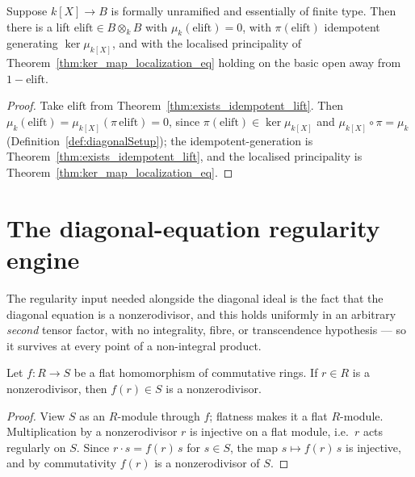 \begin{theorem}
  \label{thm:exists_diagonalLocalization}
  \leanok
  Suppose \(k[X] \to B\) is formally unramified and essentially of finite type. Then there is a
  lift \(\mathrm{elift} \in B \otimes_k B\) with \(\mu_k(\mathrm{elift}) = 0\), with
  \(\pi(\mathrm{elift})\) idempotent generating \(\ker \mu_{k[X]}\), and with the localised
  principality of Theorem~\ref{thm:ker_map_localization_eq} holding on the basic open away from
  \(1 - \mathrm{elift}\).
\end{theorem}
\begin{proof}
  \leanok
  Take \(\mathrm{elift}\) from Theorem~\ref{thm:exists_idempotent_lift}. Then
  \(\mu_k(\mathrm{elift}) = \mu_{k[X]}(\pi\,\mathrm{elift}) = 0\), since \(\pi(\mathrm{elift}) \in
  \ker \mu_{k[X]}\) and \(\mu_{k[X]} \circ \pi = \mu_k\) (Definition~\ref{def:diagonalSetup}); the
  idempotent-generation is Theorem~\ref{thm:exists_idempotent_lift}, and the localised
  principality is Theorem~\ref{thm:ker_map_localization_eq}.
\end{proof}

\section{The diagonal-equation regularity engine}
\label{sec:diagonal_regular}

The regularity input needed alongside the diagonal ideal is the fact that the diagonal
equation is a nonzerodivisor, and this holds uniformly in an arbitrary \emph{second} tensor
factor, with no integrality, fibre, or transcendence hypothesis — so it survives at every
point of a non-integral product.

\begin{lemma}
  \label{lem:flat_mem_nonZeroDivisors}
  \leanok
  Let \(f \colon R \to S\) be a flat homomorphism of commutative rings. If \(r \in R\) is a
  nonzerodivisor, then \(f(r) \in S\) is a nonzerodivisor.
\end{lemma}
\begin{proof}
  \leanok
  View \(S\) as an \(R\)-module through \(f\); flatness makes it a flat \(R\)-module.
  Multiplication by a nonzerodivisor \(r\) is injective on a flat module, i.e.\ \(r\) acts
  regularly on \(S\). Since \(r \cdot s = f(r)\, s\) for \(s \in S\), the map \(s \mapsto f(r)\, s\)
  is injective, and by commutativity \(f(r)\) is a nonzerodivisor of \(S\).
\end{proof}

